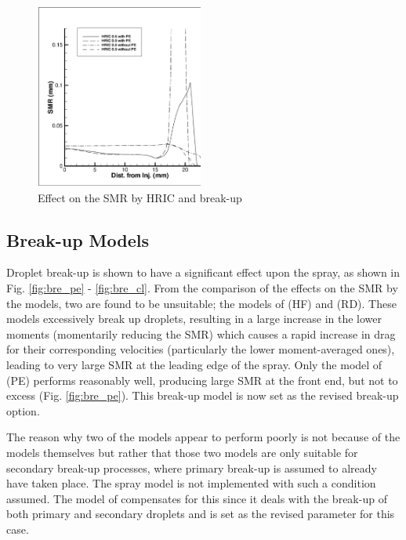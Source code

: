 \documentclass[a4paper,10pt]{article}
\begin{document}
\begin{figure}[H]
\centering
\includegraphics[width=0.49\textwidth]{pc_100_cl.eps}
\caption{Effect on the SMR by HRIC and break-up}
\label{fig:hric_grph}
\end{figure}



\subsection{Break-up Models} %
Droplet break-up is shown to have a significant effect upon the spray, as shown in Fig. \ref{fig:bre_pe} - \ref{fig:bre_cl}. From the comparison of the effects on the SMR by the models, two are found to be unsuitable; the models of \cite{hsiang1992} (HF) and \cite{reitz1986} (RD). These models excessively break up droplets, resulting in a large increase in the lower moments (momentarily reducing the SMR) which causes a rapid increase in drag for their corresponding velocities (particularly the lower moment-averaged ones), leading to very large SMR at the leading edge of the spray. Only the model of \cite{pilch1987} (PE) performs reasonably well, producing large SMR at the front end, but not to excess (Fig. \ref{fig:bre_pe}).  This break-up model is now set as the revised break-up option.

The reason why two of the models appear to perform poorly is not because of the models themselves but rather that those two models are only suitable for secondary break-up processes, where primary break-up is assumed to already have taken place. The spray model is not implemented with such a condition assumed. The model of \cite{pilch1987} compensates for this since it deals with the break-up of both primary and secondary droplets and is set as the revised parameter for this case.
\end{document}
